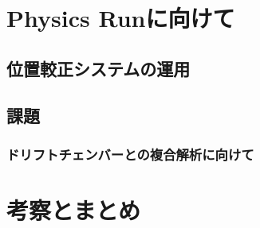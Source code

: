 \documentclass[Yonemoto_master.tex]{subfiles}
\begin{document}
\chapter{Physics Runに向けて}
\section{位置較正システムの運用}
\section{課題}
\subsection{ドリフトチェンバーとの複合解析に向けて}

\chapter{考察とまとめ}
\end{document}
